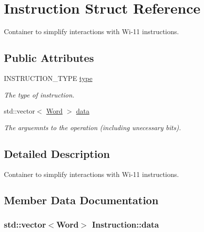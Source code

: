 \hypertarget{structInstruction}{
\section{Instruction Struct Reference}
\label{structInstruction}
}


Container to simplify interactions with Wi-\/11 instructions.  


\subsection*{Public Attributes}
\begin{DoxyCompactItemize}
\item 
\hypertarget{structInstruction_afc9f26527635d9d851759eab142e5ec7}{
INSTRUCTION\_\-TYPE \hyperlink{structInstruction_afc9f26527635d9d851759eab142e5ec7}{type}}
\label{structInstruction_afc9f26527635d9d851759eab142e5ec7}

\begin{DoxyCompactList}\small\item\em The type of instruction. \item\end{DoxyCompactList}\item 
std::vector$<$ \hyperlink{classWord}{Word} $>$ \hyperlink{structInstruction_a93f6b7366b14b17d8379ea952687960c}{data}
\begin{DoxyCompactList}\small\item\em The arguemnts to the operation (including unecessary bits). \item\end{DoxyCompactList}\end{DoxyCompactItemize}


\subsection{Detailed Description}
Container to simplify interactions with Wi-\/11 instructions. 

\subsection{Member Data Documentation}
\hypertarget{structInstruction_a93f6b7366b14b17d8379ea952687960c}{
\subsubsection[{data}]{\setlength{\rightskip}{0pt plus 5cm}std::vector$<${\bf Word}$>$ {\bf Instruction::data}}}
\label{structInstruction_a93f6b7366b14b17d8379ea952687960c}


